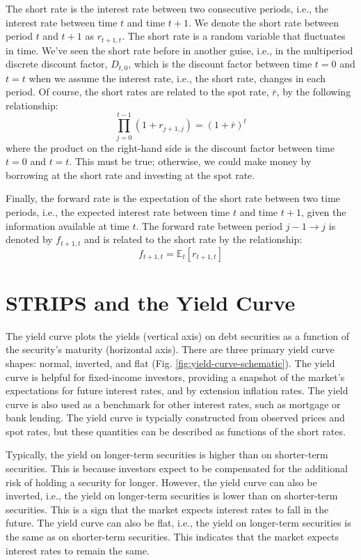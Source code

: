 \documentclass[11pt]{article}
\theoremstyle{definition}
\begin{document}
The short rate is the interest rate between two consecutive periods, i.e., the interest rate between time $t$ and time $t+1$. We denote the short rate between period $t$ and $t+1$ as $r_{t+1,t}$. The short rate is a random variable that fluctuates in time. We've seen the short rate before in another guise, i.e., in the multiperiod discrete discount factor, $D_{t,0}$, which is the discount factor between time $t = 0$ and $t = t$ when we assume the 
interest rate, i.e., the short rate, changes in each period. Of course, the short rates are related to the spot rate, $\bar{r}$, by the following relationship:
\begin{equation}
\prod_{j=0}^{t-1}\left(1+r_{j+1,j}\right) = \left(1+\bar{r}\right)^{t}
\end{equation}
where the product on the right-hand side is the discount factor between time $t = 0$ and $t = t$.
This must be true; otherwise, we could make money by borrowing at the short rate and investing at the spot rate.

Finally, the forward rate is the expectation of the short rate between two time periods, i.e., the expected interest rate between time $t$ and time $t+1$, given the information available at time $t$. 
The forward rate between period $j-1\rightarrow{j}$ is denoted by $f_{t+1,t}$ and is related to the short rate by the relationship:
\begin{equation}
	f_{t+1,t} = \mathbb{E}_{t}\left[r_{t+1,t}\right]
\end{equation}

\section*{STRIPS and the Yield Curve}
The yield curve plots the yields (vertical axis) on debt securities as a function of the security's maturity (horizontal axis). 
There are three primary yield curve shapes: normal, inverted, and flat (Fig. \ref{fig:yield-curve-schematic}).
The yield curve is helpful for fixed-income investors, providing a snapshot of the market's expectations for future interest rates, and by extension inflation rates. The yield curve is also used as a benchmark for other interest rates, such as mortgage or bank lending. The yield curve is typcially constructed from observed prices and spot rates, but these quantities can be described as functions of the short rates. 

Typically, the yield on longer-term securities is higher than on shorter-term securities. This is because investors expect to be compensated for the additional risk of holding a security for longer. However, the yield curve can also be inverted, i.e., the yield on longer-term securities is lower than on shorter-term securities. This is a sign that the market expects interest rates to fall in the future. The yield curve can also be flat, i.e., the yield on longer-term securities is the same as on shorter-term securities. This indicates that the market expects interest rates to remain the same.
\end{document}
